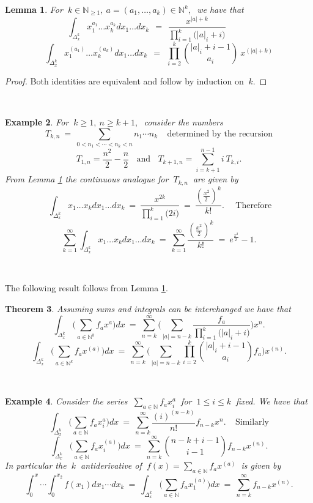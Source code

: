 \documentclass[10pt,leqeq]{article}
\newtheorem{thm}{Theorem}%
\newtheorem{lem}[thm]{Lemma}%
\newtheorem{exmp}[thm]{Example}
\begin{document}
\begin{lem}\label{l1}
{\em For $\ k \in \mathbb{N}_{\geq 1}, \ a=(a_1,\dots,a_k)\in \mathbb{N}^k, \ $ we have that
$$\int_{\Delta^k_x}x_1^{a_1}\dots x_k^{a_k}dx_1\dots dx_k \ \ = \ \ 
\frac{x^{|a| + k}}{\prod_{i=1}^{k}\big(|a|_i+i\big)} \ \ \ \ \ \ \ \ \ \ \ \ \ $$
$$\int_{\Delta^k_x}x_1^{(a_1)}\dots x_k^{(a_k)}dx_1\dots dx_k \ \ = \ \ 
\prod_{i=2}^{k}\binom{|a|_i+i-1}{a_i}\ x^{(|a|+k)}$$  }
\end{lem}
\begin{proof}
Both identities are equivalent and follow by induction on $\ k.$
\end{proof}

\

\begin{exmp}
{\em For $\ k \geq 1, \ n \geq k+1, \ $ consider the numbers
$$T_{k,n} \ = \ \sum_{0<n_1 <  \cdots < n_k < n} n_1 \cdots n_k
\ \ \ \ \ \mbox{determined by the recursion}$$
$$T_{1,n}= \frac{n^2}{2}-\frac{n}{2} \ \ \ \ \mbox{and} \ \ \ \ T_{k+1,n}  =  \sum_{i=k+1}^{n-1}i\ T_{k,i}.$$
From Lemma \ref{l1} the continuous analogue for $\ T_{k,n} \ $  are given by  
$$\ \int_{\Delta^k_x}x_1\dots x_k dx_1\dots dx_k \ = \  
\frac{x^{2k}}{\prod_{i=1}^{k}\big(2i\big)} \ = \ \frac{(\frac{x^2}{2 \ })^k}{k!} . \ \ \ \ \ \  \mbox{Therefore}$$
$$\sum_{k=1}^{\infty}  \int_{\Delta^k_x}x_1\dots x_k dx_1\dots dx_k \ = \ 
\sum_{k=1}^{\infty}\frac{(\frac{x^2}{2})^k}{k!} \ = \ e^{\frac{x^2}{2\ }}-1 .$$
}
\end{exmp}


\

The following result follows from  Lemma \ref{l1}.\\

\begin{thm}
{\em Assuming sums  and integrals can be interchanged we have that
$$\int_{\Delta^k_x}\bigg( \sum_{a\in \mathbb{N}^k}f_a x^a \bigg)dx \  = \
\sum_{n=k}^{\infty}\bigg(\sum_{|a|=n-k} \frac{f_a}{\prod_{i=1}^{k}\big(|a|_i+i\big)} \bigg)x^n .$$
$$\int_{\Delta^k_x}\bigg( \sum_{a\in \mathbb{N}^k}f_a x^{(a)} \bigg)dx \  = \
\sum_{n=k}^{\infty}\bigg(\sum_{|a|=n-k} \prod_{i=2}^{k}\binom{|a|_i+i-1}{a_i}f_a  \bigg)  x^{(n)}.$$
}
\end{thm}

\


\begin{exmp}
{\em  Consider the series $\ \sum_{a\in \mathbb{N}}f_a x_i^a \ $  for  
$ \ 1 \leq i \leq k\ $ fixed. We have that
$$\int_{\Delta^k_x}\bigg(\sum_{a\in \mathbb{N}}f_a x_i^a\bigg)dx \  = \
\sum_{n=k}^{\infty}\frac{(i)^{(n-k)}}{n!}f_{n-k}x^n. \ \ \ \ \ 
\mbox{Similarly} $$ 
$$\int_{\Delta^k_x}\bigg(\sum_{a\in \mathbb{N}}f_a x_i^{(a)}\bigg)dx \  = \
\sum_{n=k}^{\infty}\binom{n-k+i-1}{i-1}f_{n-k}x^{(n)} .$$
In particular the $\ k\ $ antiderivative of $\ f(x)= \sum_{a\in \mathbb{N}}f_a x^{(a)} \ $ is given by
$$\int_{0}^{x}\cdots \int_{0}^{x_2}f(x_1)dx_1 \cdots dx_{k} \ = \
\int_{\Delta^k_x}\bigg(\sum_{a\in \mathbb{N}}f_a x_1^{(a)}\bigg)dx \  = \
\sum_{n=k}^{\infty}f_{n-k}x^{(n)} .$$

}
\end{exmp}
\end{document}
